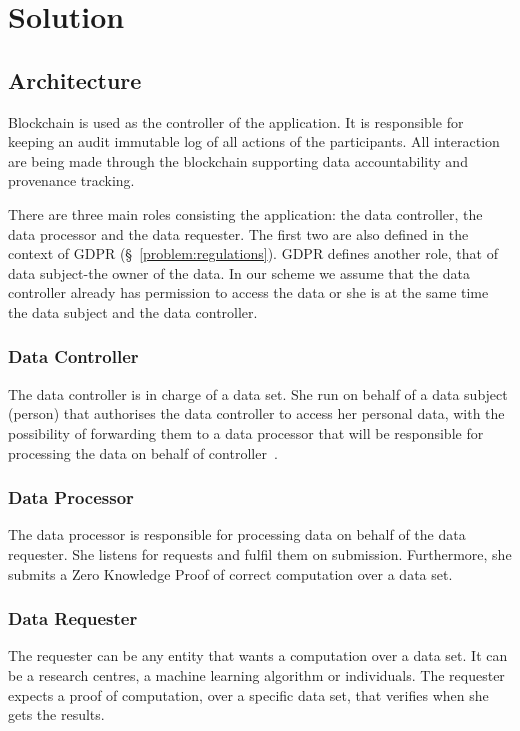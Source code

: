 \chapter{Solution}
\label{solution}

\section{Architecture}

Blockchain is used as the controller of the application. It is responsible for keeping an
audit immutable log of all actions of the participants. All interaction are being made
through the blockchain supporting data accountability and provenance tracking.

There are three main roles consisting the application: the data controller, the data processor
and the data requester. The first two are also defined in the context of GDPR (§~\ref{problem:regulations}).
GDPR defines another role, that of data subject-the owner of the data.
In our scheme we assume that the data controller already has permission to access the data or
she is at the same time the data subject and the data controller.

\subsection{Data Controller}

The data controller is in charge of a data set. She run on behalf of a data subject (person)
that authorises the data controller to access her personal data, with the possibility of forwarding
them to a data processor that will be responsible for processing the data on behalf of controller~\cite{DBLP:journals/corr/NeisseSF17}.

\subsection{Data Processor}

The data processor is responsible for processing data on behalf of the data requester. She listens
for requests and fulfil them on submission. Furthermore, she submits a Zero Knowledge Proof of correct computation over
a data set.

\subsection{Data Requester}

The requester can be any entity that wants a computation over a data set. It can be a research centres, a machine learning
algorithm or individuals. The requester expects a proof of computation, over a specific data set, that verifies when she
gets the results.

